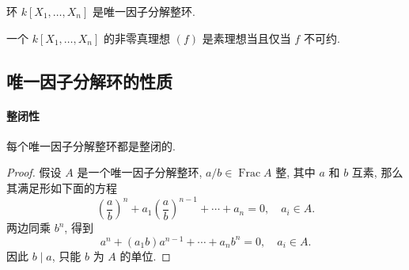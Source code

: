 \begin{theorem}
  环 \( k[X_1, \ldots, X_n] \) 是唯一因子分解整环.
\end{theorem}

\begin{corollary}
  一个 \( k[X_1, \ldots, X_n] \) 的非零真理想 \( (f) \) 是素理想当且仅当 \( f \)
  不可约.
\end{corollary}

\subsection{唯一因子分解环的性质}

\paragraph{整闭性}

\begin{proposition}
  每个唯一因子分解整环都是整闭的.
\end{proposition}
\begin{proof}
  假设 \( A \) 是一个唯一因子分解整环, \( a/b \in \operatorname{Frac} A \) 整,
  其中 \( a \) 和 \( b \) 互素, 那么其满足形如下面的方程
  \[
    \left(\frac{a}{b}\right)^n + a_1 \left(\frac{a}{b}\right)^{n - 1} + \cdots + a_n = 0,\quad a_i \in
    A.
  \]
  两边同乘 \( b^n \), 得到
  \[
    a^n + (a_1b) a^{n - 1} + \cdots + a_nb^n = 0,\quad a_i \in
    A.
  \]
  因此 \( b \mid a \), 只能 \( b \) 为 \( A \) 的单位.
\end{proof}

